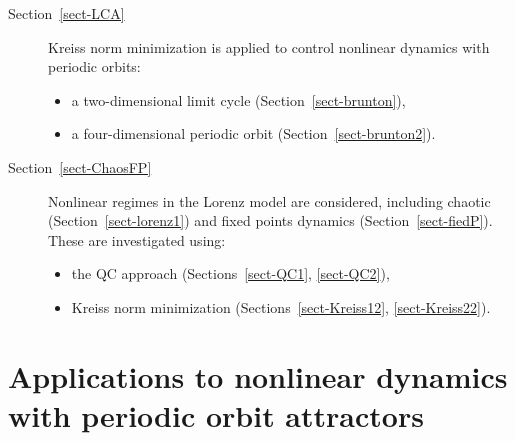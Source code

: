 \documentclass[12pt, a4paper,reqno]{amsart}
\theoremstyle{definition}
\begin{document}
\begin{description}
  \item[Section~\ref{sect-LCA}] 
  Kreiss norm minimization is applied to control nonlinear dynamics with periodic orbits:
  \begin{itemize}
    \item a two-dimensional limit cycle (Section~\ref{sect-brunton}),
    \item a four-dimensional periodic orbit (Section~\ref{sect-brunton2}).
  \end{itemize}

  \item[Section~\ref{sect-ChaosFP}] 
  Nonlinear regimes in the Lorenz model are considered, including chaotic  (Section~\ref{sect-lorenz1}) and fixed points dynamics (Section~\ref{sect-fiedP}). These are investigated using:
  \begin{itemize}
    \item the QC approach (Sections~\ref{sect-QC1}, \ref{sect-QC2}),
    \item Kreiss norm minimization (Sections~\ref{sect-Kreiss12}, \ref{sect-Kreiss22}).
  \end{itemize}
\end{description}



\section{Applications to nonlinear dynamics with periodic orbit attractors \label{sect-LCA}}
\end{document}
